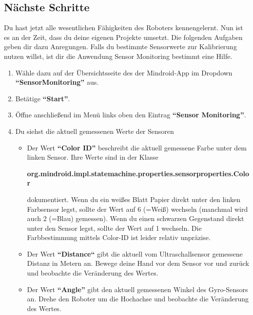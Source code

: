 \documentclass[
	12pt,
	colorbacktitle,
	german,
	accentcolor=tud1c
]{tuddesign/tudexercise}
\begin{document}
	\subsection{Nächste Schritte}
	Du hast jetzt alle wesentlichen Fähigkeiten des Roboters kennengelernt. Nun ist es an der Zeit, dass du deine eigenen Projekte umsetzt. Die folgenden Aufgaben geben dir dazu Anregungen.
	Falls du bestimmte Sensorwerte zur Kalibrierung nutzen willst, ist dir die Anwendung Sensor Monitoring bestimmt eine Hilfe.
	\begin{enumerate}
	\item Wähle dazu auf der Übersichtsseite des der Mindroid-App im Dropdown \textbf{“SensorMonitoring” }aus.
	\item Betätige \textbf{“Start”}.
	\item Öffne anschließend im Menü links oben den Eintrag \textbf{“Sensor Monitoring”}.
	\item Du siehst die aktuell gemessenen Werte der Sensoren
	\begin{itemize}
	
	\item Der Wert \textbf{“Color ID” }beschreibt die aktuell gemessene Farbe unter dem linken Sensor. Ihre Werte sind in der Klasse \begin{center} \textbf{org.mindroid.impl.statemachine.properties.sensorproperties.Color} 
	\end{center}dokumentiert. Wenn du ein weißes Blatt Papier direkt unter den linken Farbsensor legst, sollte der Wert auf 6 (=Weiß) wechseln (manchmal wird auch 2 (=Blau) gemessen). Wenn du einen schwarzen Gegenstand direkt unter den Sensor legst, sollte der Wert auf 1 wechseln. Die Farbbestimmung mittels Color-ID ist leider relativ unpräzise.
	\item Der Wert \textbf{“Distance“} gibt die aktuell vom Ultraschallsensor gemessene Distanz in Metern an. Bewege deine Hand vor dem Sensor vor und zurück und beobachte die Veränderung des Wertes.
	\item Der Wert \textbf{“Angle” }gibt den aktuell gemessenen Winkel des Gyro-Sensors an. Drehe den Roboter um die Hochachse und beobachte die Veränderung des Wertes.
	\end{itemize}
	\end{enumerate}
\end{document}
